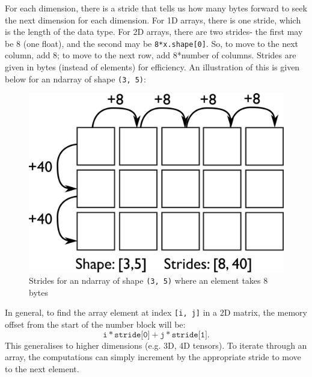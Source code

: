 \documentclass[a4paper, openany]{memoir}
\begin{document}
    For each dimension, there is a stride that tells us how many bytes forward to seek the next dimension for each dimension. For 1D arrays, there is one stride, which is the length of the data type. For 2D arrays, there are two strides- the first may be 8 (one float), and the second may be \texttt{8*x.shape[0]}. So, to move to the next column, add 8; to move to the next row, add 8*number of columns. Strides are given in bytes (instead of elements) for efficiency. An illustration of this is given below for an ndarray of shape \texttt{(3, 5)}:
    \begin{figure}[H]
        \centering
        \includegraphics[scale=0.5]{src/1.4 Strides.png}
        \caption{Strides for an ndarray of shape \texttt{(3, 5)} where an element takes 8 bytes}
    \end{figure}

    In general, to find the array element at index \texttt{[i, j]} in a 2D matrix, the memory offset from the start of the number block will be:
    \[\texttt{i} * \texttt{stride[0]} + \texttt{j} * \texttt{stride[1]}.\]
    This generalises to higher dimensions (e.g. 3D, 4D tensors). To iterate through an array, the computations can simply increment by the appropriate stride to move to the next element.
\end{document}
